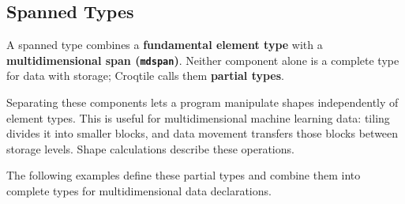 \subsection*{Spanned Types}

A spanned type combines a \textbf{fundamental element type} with a \textbf{multidimensional span (\texttt{mdspan})}. Neither component alone is a complete type for data with storage; Croqtile calls them \textbf{partial types}.

Separating these components lets a program manipulate shapes independently of element types. This is useful for multidimensional machine learning data: tiling divides it into smaller blocks, and data movement transfers those blocks between storage levels. Shape calculations describe these operations.

The following examples define these partial types and combine them into complete types for multidimensional data declarations.
